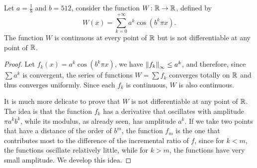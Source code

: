 \begin{example}
Let $a=\frac 1 8$ and $b=512$, consider the function $W\colon {\mathbb R} \to {\mathbb R}$,
defined by
\[
   W(x) = \sum_{k=0}^{+\infty} a^k \cos(b^k \pi x).
\]
The function $W$ is continuous at every point of ${\mathbb R}$ but is not differentiable
at any point of ${\mathbb R}$.
\end{example}
\begin{proof}
Let $f_k(x) = a^k \cos(b^k \pi x)$, we have ${\left\Vert f_k\right\Vert}_{\infty} \leq a^k$, and
therefore, since $\sum a^k$ is convergent, the series of functions $W = \sum
f_k$ converges totally on ${\mathbb R}$ and thus converges uniformly. Since each $f_k$
is continuous, $W$ is also continuous.

It is much more delicate to prove that $W$ is not differentiable at any point of
${\mathbb R}$. The idea is that the function $f_k$ has a derivative that oscillates with
amplitude $\pi a^k b^k$, while its modulus, as already seen, has amplitude
$a^k$. If we take two points that have a distance of the order of $b^m$, the
function $f_m$ is the one that contributes most to the difference of the
incremental ratio of $f$, since for $k<m$, the functions oscillate relatively
little, while for $k>m$, the functions have very small amplitude. We develop
this idea.


\end{proof}
